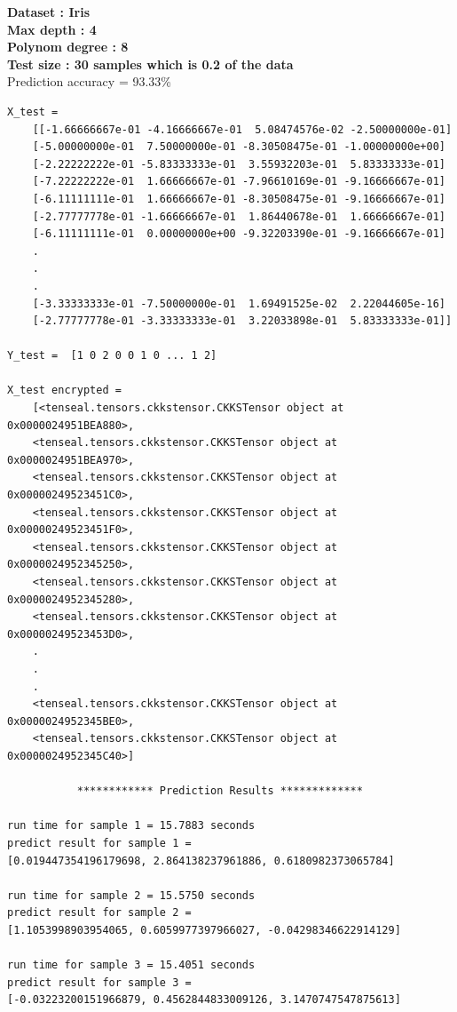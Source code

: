 \documentclass[11pt]{article}
\begin{document}
\textbf{Dataset : Iris}\\
\textbf{Max depth : 4}\\
\textbf{Polynom degree : 8 }\\
\textbf{Test size : 30 samples which is 0.2 of the data}\\
\large {Prediction accuracy = 93.33\%}\\
\begin{lstlisting}
X_test =  
    [[-1.66666667e-01 -4.16666667e-01  5.08474576e-02 -2.50000000e-01]
    [-5.00000000e-01  7.50000000e-01 -8.30508475e-01 -1.00000000e+00]
    [-2.22222222e-01 -5.83333333e-01  3.55932203e-01  5.83333333e-01]
    [-7.22222222e-01  1.66666667e-01 -7.96610169e-01 -9.16666667e-01]
    [-6.11111111e-01  1.66666667e-01 -8.30508475e-01 -9.16666667e-01]
    [-2.77777778e-01 -1.66666667e-01  1.86440678e-01  1.66666667e-01]
    [-6.11111111e-01  0.00000000e+00 -9.32203390e-01 -9.16666667e-01]
    .
    .
    .
    [-3.33333333e-01 -7.50000000e-01  1.69491525e-02  2.22044605e-16]
    [-2.77777778e-01 -3.33333333e-01  3.22033898e-01  5.83333333e-01]]
 
Y_test =  [1 0 2 0 0 1 0 ... 1 2]

X_test encrypted = 
    [<tenseal.tensors.ckkstensor.CKKSTensor object at 0x0000024951BEA880>, 
    <tenseal.tensors.ckkstensor.CKKSTensor object at 0x0000024951BEA970>, 
    <tenseal.tensors.ckkstensor.CKKSTensor object at 0x00000249523451C0>, 
    <tenseal.tensors.ckkstensor.CKKSTensor object at 0x00000249523451F0>, 
    <tenseal.tensors.ckkstensor.CKKSTensor object at 0x0000024952345250>, 
    <tenseal.tensors.ckkstensor.CKKSTensor object at 0x0000024952345280>, 
    <tenseal.tensors.ckkstensor.CKKSTensor object at 0x00000249523453D0>,
    .
    .
    .
    <tenseal.tensors.ckkstensor.CKKSTensor object at 0x0000024952345BE0>, 
    <tenseal.tensors.ckkstensor.CKKSTensor object at 0x0000024952345C40>]
    
           ************ Prediction Results *************
           
run time for sample 1 = 15.7883 seconds
predict result for sample 1 =
[0.019447354196179698, 2.864138237961886, 0.6180982373065784]

run time for sample 2 = 15.5750 seconds
predict result for sample 2 =
[1.1053998903954065, 0.6059977397966027, -0.04298346622914129]

run time for sample 3 = 15.4051 seconds
predict result for sample 3 = 
[-0.03223200151966879, 0.4562844833009126, 3.1470747547875613]


\end{lstlisting}
\end{document}
